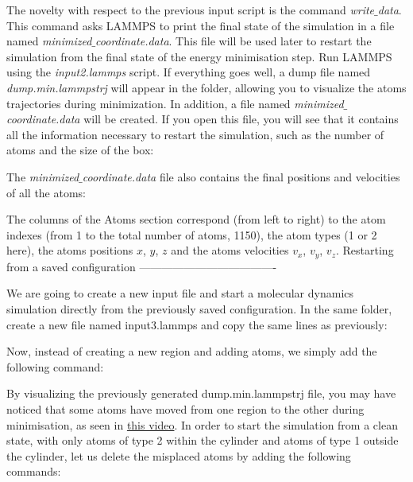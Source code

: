 \vspace{0.5cm} \noindent The novelty with respect to the previous
input script is the command \textit{write$\_$data}. This command
asks LAMMPS to print the final state of the simulation in
a file named \textit{minimized$\_$coordinate.data}. This file will
be used later to restart the simulation from the final
state of the energy minimisation step.
Run LAMMPS using the \textit{input2.lammps} script. If everything
goes well, a dump file named \textit{dump.min.lammpstrj} will
appear in the folder, allowing you to visualize the atoms
trajectories during minimization. In
addition, a file named \textit{minimized$\_$coordinate.data} will be
created. If you open this file, you will see that it
contains all the information necessary to restart the
simulation, such as the number of atoms and the size of
the box:

\vspace{0.5cm} \noindent The \textit{minimized$\_$coordinate.data} file also contains the final
positions and velocities of all the atoms:

\vspace{0.5cm} \noindent The columns of the Atoms section
correspond (from left to right) to the atom indexes (from 1
to the total number of atoms, 1150), the atom types (1 or 2
here), the atoms positions $x$, $y$, $z$ and the
atoms velocities $v_x$, $v_y$, $v_z$.
Restarting from a saved configuration
-------------------------------------

\vspace{0.5cm} \noindent We are going to create a new input file and start a
molecular dynamics simulation directly from the previously
saved configuration. In the same folder, create a new file
named input3.lammps and copy the same lines as previously:

\vspace{0.5cm} \noindent Now, instead of creating a new region and adding atoms, we
simply add the following command:

\vspace{0.5cm} \noindent By visualizing the previously generated dump.min.lammpstrj
file, you may have noticed that some atoms have moved from
one region to the other during minimisation, as seen in
\href{https://www.youtube.com/embed/gfJ_n33-F6A}{this video}.
In order to start the simulation from a clean state, with
only atoms of type 2 within the cylinder and atoms of type
1 outside the cylinder, let us delete the misplaced atoms
by adding the following commands:

